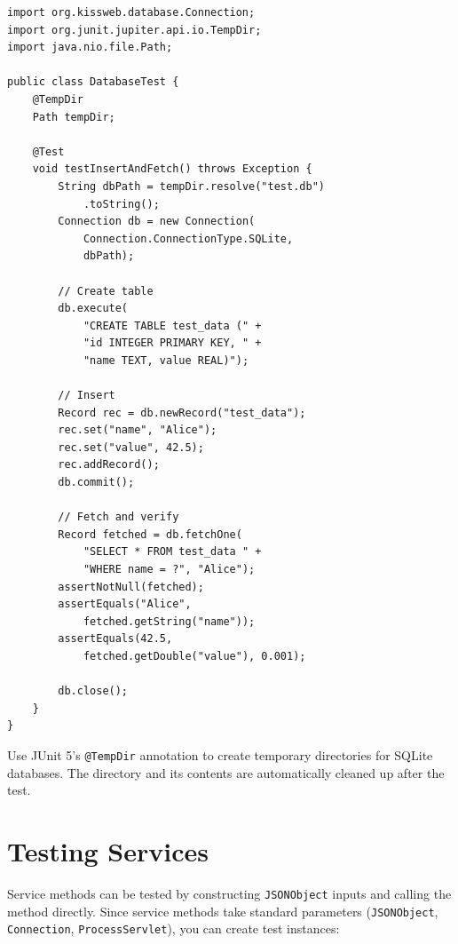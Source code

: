 \begin{lstlisting}[style=java]
import org.kissweb.database.Connection;
import org.junit.jupiter.api.io.TempDir;
import java.nio.file.Path;

public class DatabaseTest {
    @TempDir
    Path tempDir;

    @Test
    void testInsertAndFetch() throws Exception {
        String dbPath = tempDir.resolve("test.db")
            .toString();
        Connection db = new Connection(
            Connection.ConnectionType.SQLite,
            dbPath);

        // Create table
        db.execute(
            "CREATE TABLE test_data (" +
            "id INTEGER PRIMARY KEY, " +
            "name TEXT, value REAL)");

        // Insert
        Record rec = db.newRecord("test_data");
        rec.set("name", "Alice");
        rec.set("value", 42.5);
        rec.addRecord();
        db.commit();

        // Fetch and verify
        Record fetched = db.fetchOne(
            "SELECT * FROM test_data " +
            "WHERE name = ?", "Alice");
        assertNotNull(fetched);
        assertEquals("Alice",
            fetched.getString("name"));
        assertEquals(42.5,
            fetched.getDouble("value"), 0.001);

        db.close();
    }
}
\end{lstlisting}

\begin{tipbox}
Use JUnit 5's \texttt{@TempDir} annotation to create temporary directories for SQLite databases.  The directory and its contents are automatically cleaned up after the test.
\end{tipbox}

\section{Testing Services}
\label{sec:test-services}

Service methods can be tested by constructing \texttt{JSONObject} inputs and calling the method directly.  Since service methods take standard parameters (\texttt{JSONObject}, \texttt{Connection}, \texttt{ProcessServlet}), you can create test instances:

